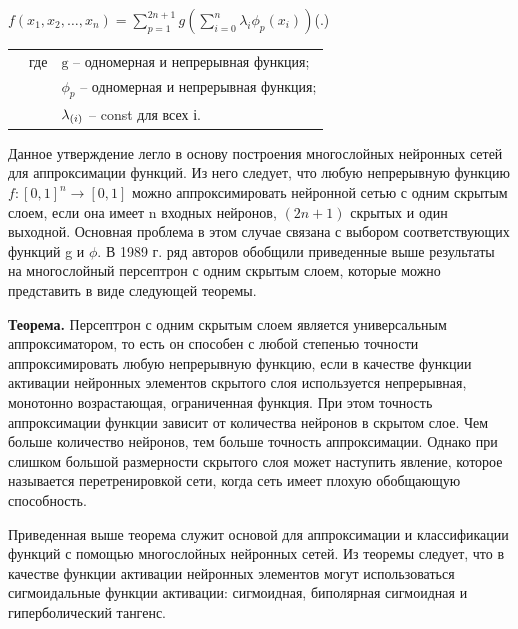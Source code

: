 {	\formulaspace \par \redline 
	$\mathit{f}(x_1,x_2,\dots,x_n) = \sum \limits _{p=1}^{2n+1} g( \sum \limits _{i=0}^{n} \lambda_{i} \phi_{p}(x_{i}))$\hfill (\thechaptercntr .\theformulacntr) \redline
	\formulaspace \addtocounter{formulacntr}{1}
	 
	
	\begin{tabular}{p{}p{}p{}}
		& где  & $\textrm{g}$ {--} одномерная и непрерывная функция; \\
		&      & $\phi_{p}$ {--} одномерная и непрерывная функция; \\
		&      & $\lambda_{\textrm(i)}$ {--} const для всех і. \\
		\end{tabular}
	
	\par \redline Данное утверждение легло в основу построения многослойных нейронных сетей для аппроксимации функций. Из него следует, что любую непрерывную функцию $\mathit{f}:[0,1]^{n} \rightarrow [0,1] $  можно аппроксимировать нейронной сетью с одним скрытым слоем, если она имеет n входных нейронов, $(2n + 1)$ скрытых и один выходной. Основная проблема в этом случае связана с выбором соответствующих функций g и $\phi$. В 1989 г. ряд авторов обобщили приведенные выше результаты на многослойный персептрон с одним скрытым слоем, которые можно представить в виде следующей теоремы.
	
	\par \redline \textbf{Теорема.} Персептрон с одним скрытым слоем является универсальным аппроксиматором, то есть он способен с любой степенью точности аппроксимировать любую непрерывную функцию, если в качестве функции активации нейронных элементов скрытого слоя используется непрерывная, монотонно возрастающая, ограниченная функция. При этом точность аппроксимации функции зависит от количества нейронов в скрытом слое. Чем больше количество нейронов, тем больше точность аппроксимации. Однако при слишком большой размерности скрытого слоя может наступить явление, которое называется перетренировкой сети, когда сеть имеет плохую обобщающую способность.
	
	\par \redline Приведенная выше теорема служит основой для аппроксимации и классификации функций с помощью многослойных нейронных сетей. Из теоремы следует, что в качестве функции активации нейронных элементов могут использоваться сигмоидальные функции активации: сигмоидная, биполярная сигмоидная и гиперболический тангенс.
	
}
